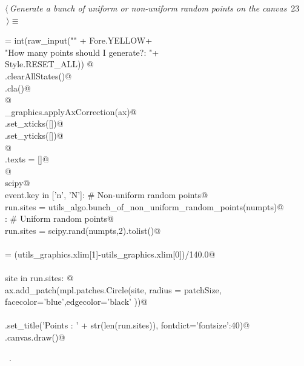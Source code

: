 \documentclass[11.5pt]{report}
\begin{document}
\begin{flushleft} \small\label{scrap26}\raggedright\small
{} $\langle\,${\itshape Generate a bunch of uniform or non-uniform random points on the canvas}\nobreak\ {\footnotesize {23}}$\,\rangle\equiv$
\vspace{-1ex}
\begin{list}{}{} \item
\mbox{}\verb@numpts = int(raw_input("\n" + Fore.YELLOW+\@\\
\mbox{}\verb@                       "How many points should I generate?: "+\@\\
\mbox{}\verb@                       Style.RESET_ALL)) @\\
\mbox{}\verb@run.clearAllStates()@\\
\mbox{}\verb@ax.cla()@\\
\mbox{}\verb@               @\\
\mbox{}\verb@utils_graphics.applyAxCorrection(ax)@\\
\mbox{}\verb@ax.set_xticks([])@\\
\mbox{}\verb@ax.set_yticks([])@\\
\mbox{}\verb@                @\\
\mbox{}\verb@fig.texts = []@\\
\mbox{}\verb@                 @\\
\mbox{}\verb@import scipy@\\
\mbox{}\verb@if event.key in ['n', 'N']: # Non-uniform random points@\\
\mbox{}\verb@        run.sites = utils_algo.bunch_of_non_uniform_random_points(numpts)@\\
\mbox{}\verb@else : # Uniform random points@\\
\mbox{}\verb@        run.sites = scipy.rand(numpts,2).tolist()@\\
\mbox{}\verb@@\\
\mbox{}\verb@patchSize  = (utils_graphics.xlim[1]-utils_graphics.xlim[0])/140.0@\\
\mbox{}\verb@@\\
\mbox{}\verb@for site in run.sites:      @\\
\mbox{}\verb@    ax.add_patch(mpl.patches.Circle(site, radius = patchSize, \@\\
\mbox{}\verb@                 facecolor='blue',edgecolor='black' ))@\\
\mbox{}\verb@@\\
\mbox{}\verb@ax.set_title('Points : ' + str(len(run.sites)), fontdict={'fontsize':40})@\\
\mbox{}\verb@fig.canvas.draw()@\\
\mbox{}\verb@@{\NWsep}
\end{list}
\vspace{-1.5ex}
\footnotesize
\begin{list}{}{\setlength{\itemsep}{-\parsep}\setlength{\itemindent}{-\leftmargin}}
\item \NWtxtMacroRefIn\ .

\item{}
\end{list}
\vspace{4ex}
\end{flushleft}
\end{document}
